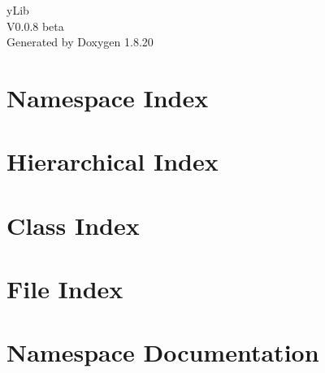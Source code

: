 \let\mypdfximage\pdfximage\def\pdfximage{\immediate\mypdfximage}\documentclass[twoside]{book}
\newcommand{\+}{\discretionary{\mbox{\scriptsize$\hookleftarrow$}}{}{}}
\newcommand{\clearemptydoublepage}{%
  \newpage{\pagestyle{empty}\cleardoublepage}%
}
\begin{document}
\hypersetup{pageanchor=false,
             bookmarksnumbered=true,
             pdfencoding=unicode
            }
\begin{titlepage}
\vspace*{7cm}
\begin{center}%
{\Large y\+Lib \\[1ex]\large V0.\+0.\+8 beta }\\
\vspace*{1cm}
{\large Generated by Doxygen 1.8.20}\\
\end{center}
\end{titlepage}
\clearemptydoublepage
{}
\tableofcontents
\clearemptydoublepage
{}
\hypersetup{pageanchor=true}

\chapter{Namespace Index}

\chapter{Hierarchical Index}

\chapter{Class Index}

\chapter{File Index}

\chapter{Namespace Documentation}




\end{document}
